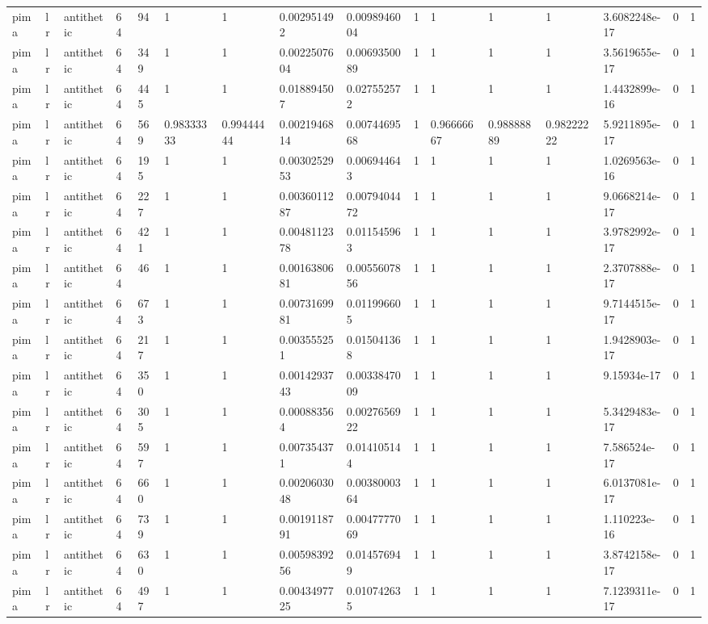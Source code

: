 \begin{tabular}{llllllllllllllll}
pima & lr & antithetic & 64 & 94 & 1 & 1 & 0.002951492 & 0.0098946004 & 1 & 1 & 1 & 1 & 3.6082248e-17 & 0 & 1 \\
pima & lr & antithetic & 64 & 349 & 1 & 1 & 0.0022507604 & 0.0069350089 & 1 & 1 & 1 & 1 & 3.5619655e-17 & 0 & 1 \\
pima & lr & antithetic & 64 & 445 & 1 & 1 & 0.018894507 & 0.027552572 & 1 & 1 & 1 & 1 & 1.4432899e-16 & 0 & 1 \\
pima & lr & antithetic & 64 & 569 & 0.98333333 & 0.99444444 & 0.0021946814 & 0.0074469568 & 1 & 0.96666667 & 0.98888889 & 0.98222222 & 5.9211895e-17 & 0 & 1 \\
pima & lr & antithetic & 64 & 195 & 1 & 1 & 0.0030252953 & 0.006944643 & 1 & 1 & 1 & 1 & 1.0269563e-16 & 0 & 1 \\
pima & lr & antithetic & 64 & 227 & 1 & 1 & 0.0036011287 & 0.0079404472 & 1 & 1 & 1 & 1 & 9.0668214e-17 & 0 & 1 \\
pima & lr & antithetic & 64 & 421 & 1 & 1 & 0.0048112378 & 0.011545963 & 1 & 1 & 1 & 1 & 3.9782992e-17 & 0 & 1 \\
pima & lr & antithetic & 64 & 46 & 1 & 1 & 0.0016380681 & 0.0055607856 & 1 & 1 & 1 & 1 & 2.3707888e-17 & 0 & 1 \\
pima & lr & antithetic & 64 & 673 & 1 & 1 & 0.0073169981 & 0.011996605 & 1 & 1 & 1 & 1 & 9.7144515e-17 & 0 & 1 \\
pima & lr & antithetic & 64 & 217 & 1 & 1 & 0.003555251 & 0.015041368 & 1 & 1 & 1 & 1 & 1.9428903e-17 & 0 & 1 \\
pima & lr & antithetic & 64 & 350 & 1 & 1 & 0.0014293743 & 0.0033847009 & 1 & 1 & 1 & 1 & 9.15934e-17 & 0 & 1 \\
pima & lr & antithetic & 64 & 305 & 1 & 1 & 0.000883564 & 0.0027656922 & 1 & 1 & 1 & 1 & 5.3429483e-17 & 0 & 1 \\
pima & lr & antithetic & 64 & 597 & 1 & 1 & 0.007354371 & 0.014105144 & 1 & 1 & 1 & 1 & 7.586524e-17 & 0 & 1 \\
pima & lr & antithetic & 64 & 660 & 1 & 1 & 0.0020603048 & 0.0038000364 & 1 & 1 & 1 & 1 & 6.0137081e-17 & 0 & 1 \\
pima & lr & antithetic & 64 & 739 & 1 & 1 & 0.0019118791 & 0.0047777069 & 1 & 1 & 1 & 1 & 1.110223e-16 & 0 & 1 \\
pima & lr & antithetic & 64 & 630 & 1 & 1 & 0.0059839256 & 0.014576949 & 1 & 1 & 1 & 1 & 3.8742158e-17 & 0 & 1 \\
pima & lr & antithetic & 64 & 497 & 1 & 1 & 0.0043497725 & 0.010742635 & 1 & 1 & 1 & 1 & 7.1239311e-17 & 0 & 1 \\

\end{tabular}

